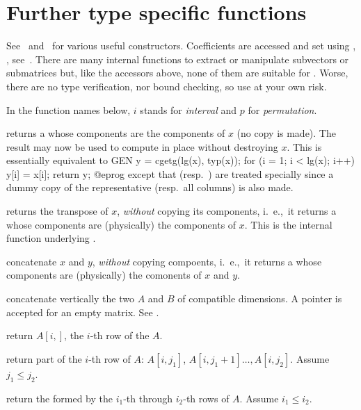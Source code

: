 \section{Further type specific functions}

See~ and~ for various useful constructors.
Coefficients are accessed and set using , ,
see~. There are many internal functions to extract or
manipulate subvectors or submatrices but, like the accessors above, none of
them are suitable for . Worse, there are no type
verification, nor bound checking, so use at your own risk.

 In the function names below, $i$ stands for \emph{interval}
and $p$ for \emph{permutation}.

 returns a  whose components are the
components of $x$ (no copy is made). The result may now be used to compute in
place without destroying $x$. This is essentially equivalent to
\bprog
  GEN y = cgetg(lg(x), typ(x));
  for (i = 1; i < lg(x); i++) y[i] = x[i];
  return y;
@eprog\noindent
except that  (resp.~) are treated specially since a
dummy copy of the representative (resp.~all columns) is also made.

 returns the transpose of $x$, \emph{without}
copying its components, i.~e.,~it returns a  whose components are
(physically) the components of $x$. This is the internal function underlying
.

 concatenate $x$ and $y$, \emph{without}
copying compoents, i.~e.,~it returns a  whose components are 
(physically) the comonents of $x$ and $y$.

 concatenate vertically the two  $A$
and $B$ of compatible dimensions. A  pointer is accepted for an
empty matrix. See .

 return $A[i,]$, the $i$-th row of the 
$A$.

 return part of the $i$-th
row of  $A$: $A[i,j_1]$, $A[i,j_1+1]\dots,A[i,j_2]$. Assume $j_1
\leq j_2$.

 return the 
formed by the $i_1$-th through $i_2$-th rows of  $A$. Assume $i_1
\leq i_2$.

